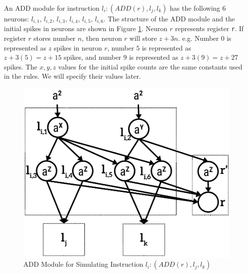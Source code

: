 \documentclass[smallextended]{svjour3}
\begin{document}

An ADD module for instruction $l_i:(ADD(r), l_j, l_k)$ has the following 6 neurons: $l_{i,1}$, $l_{i,2}$, $l_{i,3}$, $l_{i,4}$, $l_{i,5}$, $l_{i,6}$.
The structure of the ADD module and the initial spikes in neurons are shown in Figure \ref{fig-add}. Neuron $r$ represents register \texttt{r}. If 
register $r$ stores number $n$, then neuron $r$ will store $z+3n$. e.g. Number 0 is represented as $z$ spikes in neuron $r$, number $5$ is represented 
as $z+3(5)=z+15$ spikes, and number $9$ is represented as $z+3(9)=z+27$ spikes. The  $x,y,z$ values for the initial spike counts are the same 
constants used in the rules. We will specify their values later.

\begin{figure}
\begin{center}
\includegraphics[scale=0.50]{Fig1.pdf}
\caption{ADD Module for Simulating Instruction $l_i:(ADD(r), l_j, l_k)$}
\label{fig-add}
\end{center}
\end{figure}   
\end{document}
